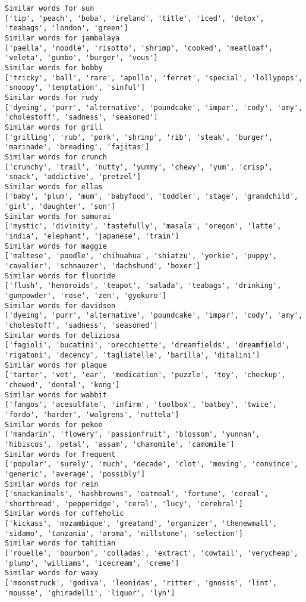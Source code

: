\documentclass[11pt]{article}
\begin{document}
\begin{Verbatim}[commandchars=\\\{\}]
Similar words for sun
['tip', 'peach', 'boba', 'ireland', 'title', 'iced', 'detox', 'teabags', 'london', 'green']
Similar words for jambalaya
['paella', 'noodle', 'risotto', 'shrimp', 'cooked', 'meatloaf', 'veleta', 'gumbo', 'burger', 'vous']
Similar words for bobby
['tricky', 'ball', 'rare', 'apollo', 'ferret', 'special', 'lollypops', 'snoopy', 'temptation', 'sinful']
Similar words for rudy
['dyeing', 'purr', 'alternative', 'poundcake', 'impar', 'cody', 'amy', 'cholestoff', 'sadness', 'seasoned']
Similar words for grill
['grilling', 'rub', 'pork', 'shrimp', 'rib', 'steak', 'burger', 'marinade', 'breading', 'fajitas']
Similar words for crunch
['crunchy', 'trail', 'nutty', 'yummy', 'chewy', 'yum', 'crisp', 'snack', 'addictive', 'pretzel']
Similar words for ellas
['baby', 'plum', 'mum', 'babyfood', 'toddler', 'stage', 'grandchild', 'girl', 'daughter', 'son']
Similar words for samurai
['mystic', 'divinity', 'tastefully', 'masala', 'oregon', 'latte', 'india', 'elephant', 'japanese', 'train']
Similar words for maggie
['maltese', 'poodle', 'chihuahua', 'shiatzu', 'yorkie', 'puppy', 'cavalier', 'schnauzer', 'dachshund', 'boxer']
Similar words for fluoride
['flush', 'hemoroids', 'teapot', 'salada', 'teabags', 'drinking', 'gunpowder', 'rose', 'zen', 'gyokuro']
Similar words for davidson
['dyeing', 'purr', 'alternative', 'poundcake', 'impar', 'cody', 'amy', 'cholestoff', 'sadness', 'seasoned']
Similar words for deliziosa
['fagioli', 'bucatini', 'orecchiette', 'dreamfields', 'dreamfield', 'rigatoni', 'decency', 'tagliatelle', 'barilla', 'ditalini']
Similar words for plaque
['tarter', 'vet', 'ear', 'medication', 'puzzle', 'toy', 'checkup', 'chewed', 'dental', 'kong']
Similar words for wabbit
['fangos', 'acesulfate', 'infirm', 'toolbox', 'batboy', 'twice', 'fordo', 'harder', 'walgrens', 'nuttela']
Similar words for pekoe
['mandarin', 'flowery', 'passionfruit', 'blossom', 'yunnan', 'hibiscus', 'petal', 'assam', 'chamomile', 'camomile']
Similar words for frequent
['popular', 'surely', 'much', 'decade', 'clot', 'moving', 'convince', 'generic', 'average', 'possibly']
Similar words for rein
['snackanimals', 'hashbrowns', 'oatmeal', 'fortune', 'cereal', 'shortbread', 'pepperidge', 'ceral', 'lucy', 'cerebral']
Similar words for coffeholic
['kickass', 'mozambique', 'greatand', 'organizer', 'thenewmall', 'sidamo', 'tanzania', 'aroma', 'millstone', 'selection']
Similar words for tahitian
['rouelle', 'bourbon', 'colladas', 'extract', 'cowtail', 'verycheap', 'plump', 'williams', 'icecream', 'creme']
Similar words for waxy
['moonstruck', 'godiva', 'leonidas', 'ritter', 'gnosis', 'lint', 'mousse', 'ghiradelli', 'liquor', 'lyn']

\end{Verbatim}
\end{document}
